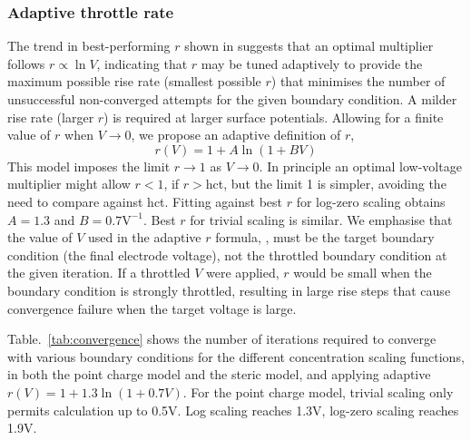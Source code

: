 \subsubsection{Adaptive throttle rate}
The trend in best-performing $r$ shown in  suggests that an
optimal multiplier follows
$r \propto \ln V$, indicating that $r$ 
may be tuned adaptively to provide the maximum possible rise rate (smallest
possible $r$) that minimises the number of unsuccessful non-converged
attempts for the given boundary condition.  A milder
rise rate (larger $r$) is required at larger surface potentials.
Allowing for a finite value of $r$ when $V \rightarrow 0$, we propose
an adaptive definition of $r$,
\begin{equation}
  r(V) = 1 + A \ln(1 + B V)
  \label{adaptive_r}
\end{equation}
This model imposes the limit $r \rightarrow 1$ as $V \rightarrow 0$.
In principle an optimal low-voltage multiplier might allow $r<1$, if
$r>$hct, but the limit 1 is simpler, avoiding the need to 
compare against hct.  Fitting against best $r$ for log-zero scaling
obtains $A=1.3$ and $B=0.7 \textrm{V}^{-1}$. Best $r$ for trivial
scaling is similar.
We emphasise that the value of $V$ used in the adaptive $r$ formula, ,
must be the target boundary condition (the final electrode voltage),
not the throttled boundary condition at the given iteration.  If a throttled $V$ were
applied, $r$ would be small when the boundary condition is strongly
throttled, resulting in large rise steps that cause convergence
failure when the  target voltage is large.


Table.~\ref{tab:convergence} shows  the number of iterations required
to converge with various boundary conditions for the different
concentration scaling functions, in both the point charge model and the
steric model, and applying adaptive
$r(V)=1+1.3\ln(1+0.7V)$. For the point charge model, trivial scaling only
permits calculation up to 0.5V. Log scaling reaches 1.3V, log-zero
scaling reaches 1.9V.

